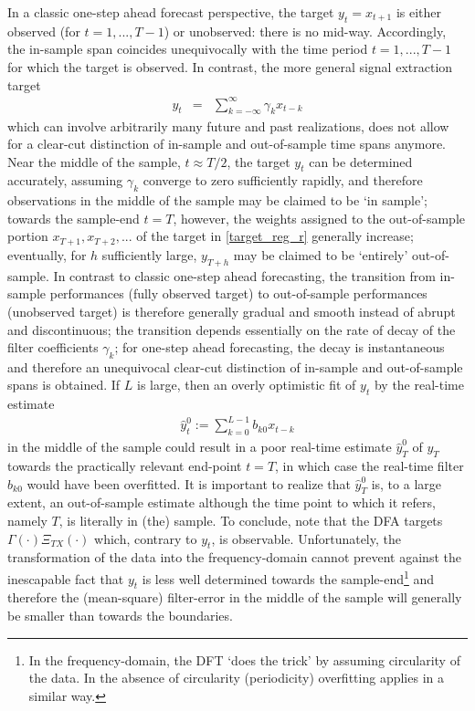 \documentclass[a4paper]{book}
\begin{document}
In a classic one-step ahead forecast perspective, the target $y_t=x_{t+1}$ is either observed (for $t=1,...,T-1$) or unobserved: there is no mid-way. Accordingly, the in-sample span coincides unequivocally with the time period $t=1,...,T-1$ for which the target is observed. In contrast, the more general signal extraction target 
\begin{eqnarray}\label{target_reg_r}
y_t&=&\sum_{k=-\infty}^{\infty}\gamma_{k} x_{t-k}
\end{eqnarray}
which can involve arbitrarily many future and past realizations, does not allow for a clear-cut distinction of in-sample and out-of-sample time spans anymore. Near the middle of the sample, $t\approx T/2$,  the target $y_{t}$ can be determined accurately, assuming $\gamma_k$ converge to zero sufficiently rapidly, and therefore observations in the middle of the sample may be claimed to be `in sample'; towards the sample-end $t=T$, however, the weights assigned to the out-of-sample portion $x_{T+1},x_{T+2},...$ of the target in \ref{target_reg_r} generally increase; eventually, for $h$ sufficiently large, $y_{T+h}$ may be claimed to be `entirely' out-of-sample. In contrast to classic one-step ahead forecasting, the transition from in-sample performances (fully observed target) to out-of-sample performances (unobserved target) is therefore generally gradual and smooth instead of abrupt and discontinuous; the transition depends essentially on the rate of decay of the filter coefficients $\gamma_k$; for one-step ahead forecasting, the decay is instantaneous and therefore an unequivocal clear-cut distinction of in-sample and out-of-sample spans is obtained. If $L$ is large, then an overly optimistic  fit of $y_t$ by the real-time estimate 
\begin{eqnarray*}
\hat{y}_{t}^{0}:=\sum_{k=0}^{L-1}b_{k0}x_{t-k}
\end{eqnarray*}
in the middle of the sample could result in a poor real-time estimate  $\hat{y}_{T}^{0}$ of $y_{T}$ towards the practically relevant end-point $t=T$, in which case the real-time filter $b_{k0}$ would have been overfitted. It is important to realize that $\hat{y}_{T}^{0}$ is, to a large extent, an out-of-sample estimate although the time point to which it refers, namely $T$, is literally in (the) sample. To conclude, note that the DFA targets $\Gamma(\cdot)\Xi_{TX}(\cdot)$ which, contrary to $y_t$, {is} observable. Unfortunately, the transformation of the data into the frequency-domain cannot prevent against the inescapable fact that $y_t$ is less well determined towards the sample-end\footnote{In the frequency-domain, the DFT `does the trick' by assuming circularity of the data. In the absence of circularity (periodicity) overfitting applies in a similar way.} and therefore the (mean-square) filter-error in the middle of the sample will generally be smaller than towards the boundaries.%
\end{document}
